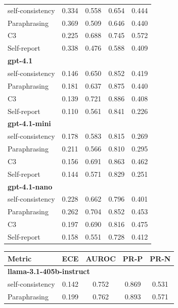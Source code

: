 \documentclass[11pt]{article}
\theoremstyle{plain}
\theoremstyle{definition}
\theoremstyle{remark}
\begin{document}
\begin{table}[p]
\begin{minipage}[t]{0.48\textwidth}
\begin{tabular}{lcccc}
        self-consistency & 0.334 & 0.558 & 0.654 & 0.444 \\
        Paraphrasing     & 0.369 & 0.509 & 0.646 & 0.440 \\
       C3             & 0.225 & 0.688 & 0.745 & 0.572 \\
        Self-report      & 0.338 & 0.476 & 0.588 & 0.409 \\
        \midrule
        \multicolumn{5}{l}{\textbf{gpt-4.1}} \\
        self-consistency & 0.146 & 0.650 & 0.852 & 0.419 \\
        Paraphrasing     & 0.181 & 0.637 & 0.875 & 0.440 \\
       C3             & 0.139 & 0.721 & 0.886 & 0.408 \\
        Self-report      & 0.110 & 0.561 & 0.841 & 0.226 \\
        \midrule
        \multicolumn{5}{l}{\textbf{gpt-4.1-mini}} \\
        self-consistency & 0.178 & 0.583 & 0.815 & 0.269 \\
        Paraphrasing     & 0.211 & 0.566 & 0.810 & 0.295 \\
       C3             & 0.156 & 0.691 & 0.863 & 0.462 \\
        Self-report      & 0.144 & 0.571 & 0.829 & 0.251 \\
        \midrule
        \multicolumn{5}{l}{\textbf{gpt-4.1-nano}} \\
        self-consistency & 0.228 & 0.662 & 0.796 & 0.401 \\
        Paraphrasing     & 0.262 & 0.704 & 0.852 & 0.453 \\
       C3             & 0.197 & 0.690 & 0.816 & 0.475 \\
        Self-report      & 0.158 & 0.551 & 0.728 & 0.412 \\
        \bottomrule
    \end{tabular}
\end{minipage}
\hfill
\begin{minipage}[t]{0.48\textwidth}
    \centering
    \begin{tabular}{lcccc}
        \toprule
        \textbf{Metric} & \textbf{ECE} & \textbf{AUROC} & \textbf{PR-P} & \textbf{PR-N} \\
        \midrule
        \multicolumn{5}{l}{\textbf{llama-3.1-405b-instruct}} \\
        self-consistency & 0.142 & 0.752 & 0.869 & 0.531 \\
        Paraphrasing     & 0.199 & 0.762 & 0.893 & 0.571 \\

\end{tabular}
\end{minipage}
\end{table}
\end{document}
